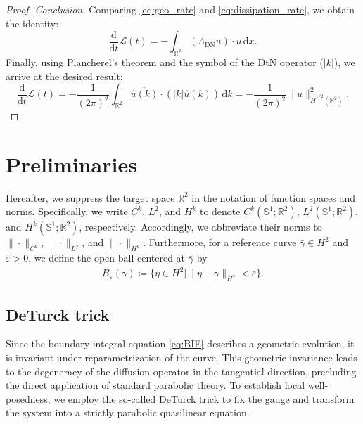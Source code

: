 \documentclass{article}
\theoremstyle{remark}
\theoremstyle{definition}
\numberwithin{equation}{section}
\begin{document}
\begin{proof}
    \textit{Conclusion.}
    Comparing \eqref{eq:geo_rate} and \eqref{eq:dissipation_rate}, we obtain the identity:
    \begin{equation*}
        \frac{\mathrm{d}}{\mathrm{d}t} \mathcal{L}(t) = -\int_{\mathbb{R}^2} (\Lambda_{\mathrm{DN}} u) \cdot u \, \mathrm{d}x.
    \end{equation*}
    Finally, using Plancherel's theorem and the symbol of the DtN operator ($|k|$), we arrive at the desired result:
    \begin{equation*}
        \frac{\mathrm{d}}{\mathrm{d}t} \mathcal{L}(t) 
        = -\frac{1}{(2\pi)^2} \int_{\mathbb{R}^2} \overline{\hat{u}(k)} \cdot (|k| \hat{u}(k)) \, \mathrm{d}k
        = -\frac{1}{(2\pi)^2} \|u\|_{\dot{H}^{1/2}(\mathbb{R}^2)}^2.
    \end{equation*}
\end{proof}



\section{Preliminaries}
\label{sec:preliminaries}

Hereafter, we suppress the target space $\mathbb{R}^2$ in the notation of function spaces and norms.
Specifically, we write $C^k$, $L^2$, and $H^k$ to denote $C^k(\mathbb{S}^1;\mathbb{R}^2)$, $L^2(\mathbb{S}^1;\mathbb{R}^2)$, and $H^k(\mathbb{S}^1;\mathbb{R}^2)$, respectively.
Accordingly, we abbreviate their norms to $\|\cdot\|_{C^k}$, $\|\cdot\|_{L^2}$, and $\|\cdot\|_{H^k}$.
Furthermore, for a reference curve $\bar{\gamma}\in H^2$ and $\varepsilon>0$, we define the open ball centered at $\bar{\gamma}$ by
\begin{align*}
    B_\varepsilon(\bar{\gamma})\coloneqq\{\eta\in H^2\mid \|\eta-\bar{\gamma}\|_{H^2}<\varepsilon\}.
\end{align*}

\subsection{DeTurck trick}

Since the boundary integral equation \eqref{eq:BIE} describes a geometric evolution, it is invariant under reparametrization of the curve. This geometric invariance leads to the degeneracy of the diffusion operator in the tangential direction, precluding the direct application of standard parabolic theory. To establish local well-posedness, we employ the so-called DeTurck trick to fix the gauge and transform the system into a strictly parabolic quasilinear equation.
\end{document}
